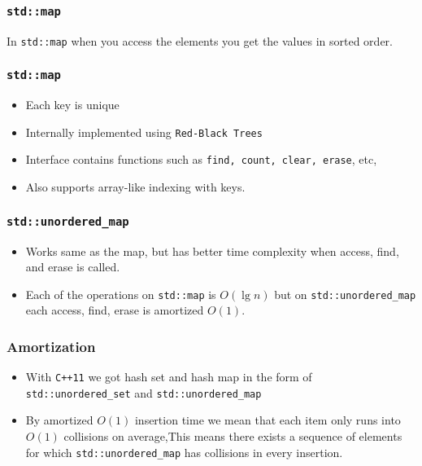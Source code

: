 \begin{frame}
    \frametitle{\texttt{std::map}}

    In \texttt{std::map} when you access the elements you get the values in sorted order.

\end{frame}

\begin{frame}
    \frametitle{\texttt{std::map}}

    \begin{itemize}
        \item Each key is unique\pause[]
        \item Internally implemented using \texttt{Red-Black Trees}\pause[]
        \item Interface contains functions such as \texttt{find, count, clear, erase}, etc,
        \item Also supports array-like indexing with keys.
    \end{itemize}

\end{frame}

\begin{frame}
    \frametitle{\texttt{std::unordered\_map}}

    
    \begin{itemize}
        \item Works same as the map, but has better time complexity when access, find, and erase is called.\pause[]
        \item Each of the operations on \texttt{std::map} is $O(\lg n)$ but on \texttt{std::unordered\_map} each access, find, erase is amortized $O(1)$.
    \end{itemize}

\end{frame}

\begin{frame}
    \frametitle{Amortization}

    
    \begin{itemize}
        \item With \texttt{C++11} we got hash set and hash map in the form of \texttt{std::unordered\_set} and \texttt{std::unordered\_map}\pause[]
        \item By amortized $O(1)$ insertion time we mean that each item only runs into $O(1)$ collisions on average,\pause[] This means there exists a sequence of elements for which \texttt{std::unordered\_map} has collisions in every insertion.
    \end{itemize}

\end{frame}

